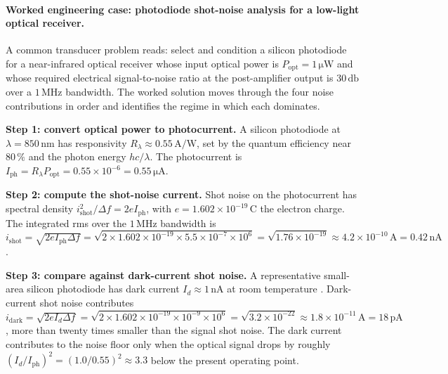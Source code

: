 \paragraph{Worked engineering case: photodiode shot-noise
analysis for a low-light optical receiver.} A common transducer
problem reads: select and condition a silicon photodiode for a
near-infrared optical receiver whose input optical power is
$P_{\text{opt}} = 1 \,\si{\micro\watt}$ and whose required
electrical signal-to-noise ratio at the post-amplifier output is
$30 \,\si{\decibel}$ over a $1 \,\si{\mega\hertz}$ bandwidth. The
worked solution moves through the four noise contributions in
order and identifies the regime in which each dominates.

\textbf{Step 1: convert optical power to photocurrent.} A silicon
photodiode at $\lambda = 850 \,\si{\nano\meter}$ has responsivity
$R_{\lambda} \approx 0.55 \,\si{\ampere\per\watt}$, set by the
quantum efficiency near $80\,\%$ and the photon energy $h c/
\lambda$. The photocurrent is
$I_{\text{ph}} = R_{\lambda} P_{\text{opt}} = 0.55 \times 10^{-6}
= 0.55 \,\si{\micro\ampere}$.

\textbf{Step 2: compute the shot-noise current.} Shot noise on
the photocurrent has spectral density
$i_{\text{shot}}^{2}/\Delta f = 2 e I_{\text{ph}}$, with $e =
1.602 \times 10^{-19} \,\si{\coulomb}$ the electron charge. The
integrated rms over the $1 \,\si{\mega\hertz}$ bandwidth is
$i_{\text{shot}} = \sqrt{2 e I_{\text{ph}} \Delta f} =
\sqrt{2 \times 1.602 \times 10^{-19} \times 5.5 \times 10^{-7}
\times 10^{6}} = \sqrt{1.76 \times 10^{-19}} \approx 4.2 \times
10^{-10} \,\si{\ampere} = 0.42 \,\si{\nano\ampere}$.

\textbf{Step 3: compare against dark-current shot noise.} A
representative small-area silicon photodiode has dark current
$I_{d} \approx 1 \,\si{\nano\ampere}$ at room temperature
\cite{text:ch05-pallas-areny-webster2001}. Dark-current shot noise
contributes $i_{\text{dark}} = \sqrt{2 e I_{d} \Delta f} =
\sqrt{2 \times 1.602 \times 10^{-19} \times 10^{-9} \times 10^{6}}
= \sqrt{3.2 \times 10^{-22}} \approx 1.8 \times 10^{-11} \,\si
{\ampere} = 18 \,\si{\pico\ampere}$, more than twenty times
smaller than the signal shot noise. The dark current contributes
to the noise floor only when the optical signal drops by roughly
$(I_{d}/I_{\text{ph}})^{2} = (1.0/0.55)^{2} \approx 3.3$ below
the present operating point.

